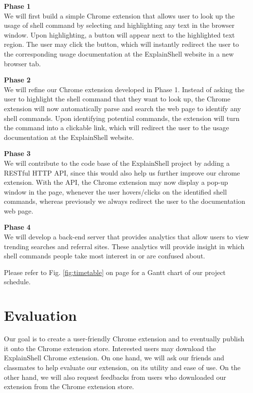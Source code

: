 \documentclass[11pt]{article}
\begin{document}
\par{\bf Phase 1}\\ 
We will first build a simple Chrome extension that allows user to look up the usage of shell command by selecting and highlighting any text in the browser window. Upon highlighting, a button will appear next to the highlighted text region. The user may click the button, which will instantly redirect the user to the corresponding usage documentation at the ExplainShell website in a new browser tab.

\par{\bf Phase 2}\\
We will refine our Chrome extension developed in Phase 1. Instead of asking the user to highlight the shell command that they want to look up, the Chrome extension will now automatically parse and search the web page to identify any shell commands. Upon identifying potential commands, the extension will turn the command into a clickable link, which will redirect the user to the usage documentation at the ExplainShell website.

\par{\bf Phase 3}\\
We will contribute to the code base of the ExplainShell project by adding a RESTful HTTP API, since this would also help us further improve our chrome extension. With the API, the Chrome extension may now display a pop-up window in the page, whenever the user hovers/clicks on the identified shell commands, whereas previously we always redirect the user to the documentation web page.

\par{\bf Phase 4}\\
We will develop a back-end server that provides analytics that allow users to view trending searches and referral sites. These analytics will provide insight in which shell commands people take most interest in or are confused about.

Please refer to Fig. \ref{fig:timetable} on page \pageref{fig:timetable} for a Gantt chart of our project schedule.

\section{Evaluation}

Our goal is to create a user-friendly Chrome extension and to eventually publish it onto the Chrome extension store. Interested users may download the ExplainShell Chrome extension. On one hand, we will ask our friends and classmates to help evaluate our extension, on its utility and ease of use. On the other hand, we will also request feedbacks from users who downloaded our extension from the Chrome extension store.
\end{document}
